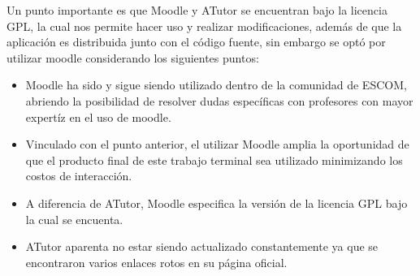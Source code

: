  \noindent Un punto importante es que Moodle y ATutor se encuentran bajo la licencia GPL,
 la cual nos permite hacer uso y realizar modificaciones, además de que la aplicación es
 distribuida junto con el código fuente, sin embargo se optó por utilizar moodle considerando
 los siguientes puntos:

    \begin{itemize}
        \item Moodle ha sido y sigue siendo utilizado dentro de la comunidad de ESCOM,
              abriendo la posibilidad de resolver dudas específicas con profesores con
              mayor expertíz en el uso de moodle.

        \item Vinculado con el punto anterior, el utilizar Moodle amplia la oportunidad
              de que el producto final de este trabajo terminal sea utilizado minimizando
              los costos de interacción.

        \item A diferencia de ATutor, Moodle especifica la versión de la licencia GPL
              bajo la cual se encuenta.
              
        \item ATutor aparenta no estar siendo actualizado constantemente ya que se
              encontraron varios enlaces rotos en su página oficial.
    \end{itemize}
 
 

  
    

